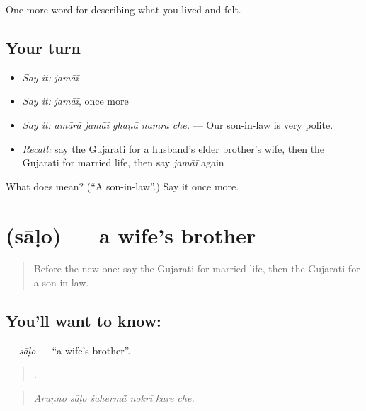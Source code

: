 \begin{grammarlens}[title={What you've built}]
One more word for describing what you lived and felt.
\end{grammarlens}

\subsection*{Your turn}
\begin{itemize}
\raggedright
  \item \emph{Say it:} \emph{jamāī}
  \item \emph{Say it:} \emph{jamāī}, once more
  \item \emph{Say it:} \emph{amārā jamāī ghaṇā namra che.} — Our son-in-law is very polite.
  \item \emph{Recall:} say the Gujarati for a husband's elder brother's wife, then the Gujarati for married life, then say \emph{jamāī} again
\end{itemize}

\begin{tcolorbox}[breakable,colback=teal!4,colframe=teal!35!black,title={Before you move on}]
What does  mean? (\textquotedblleft{}A son-in-law\textquotedblright{}.) Say it once more.
\end{tcolorbox}
\section[\texorpdfstring{\gu{સાળો} (sāḷo)}{સાળો (sāḷo)}]{ (sāḷo) — a wife's brother}

\label{lesson:GU-C491-salo}



\begin{quote}
Before the new one: say the Gujarati for married life, then the Gujarati for a son-in-law.
\end{quote}

\subsection*{You'll want to know: }
\textbf{} — \emph{sāḷo} — \textquotedblleft{}a wife's brother\textquotedblright{}.

\begin{quote}
     .
\end{quote}

\begin{quote}
\emph{Aruṇno sāḷo śahermā̃ nokrī kare che.}
\end{quote}

